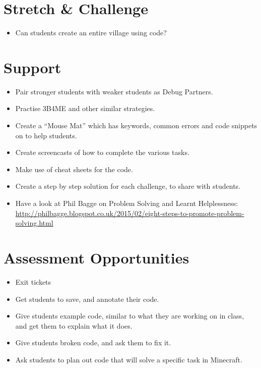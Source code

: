 \documentclass{geocraft-lesson-plan}
\begin{document}
\section*{Stretch \& Challenge}
\begin{itemize}
\item Can students create an entire village using code?
\end{itemize}

\section*{Support}
\begin{itemize}
\item Pair stronger students with weaker students as Debug Partners.
\item Practise 3B4ME and other similar strategies.
\item Create a ``Mouse Mat'' which has keywords, common errors and code snippets on to help students.
\item Create screencasts of how to complete the various tasks.
\item Make use of cheat sheets for the code.
\item Create a step by step solution for each challenge, to share with students.
\item Have a look at Phil Bagge on Problem Solving and Learnt Helplessness: 
  {\textcolor{greenish}
    {\url{http://philbagge.blogspot.co.uk/2015/02/eight-steps-to-promote-problem-solving.html}}}
\end{itemize}

\section*{Assessment Opportunities}
\begin{itemize}
\item Exit tickets
\item Get students to save, and annotate their code.
\item Give students example code, similar to what they are working on in class, and get them to explain what it does.
\item Give students broken code, and ask them to fix it.
\item Ask students to plan out code that will solve a specific task in Minecraft.
\end{itemize}

\end{document}
